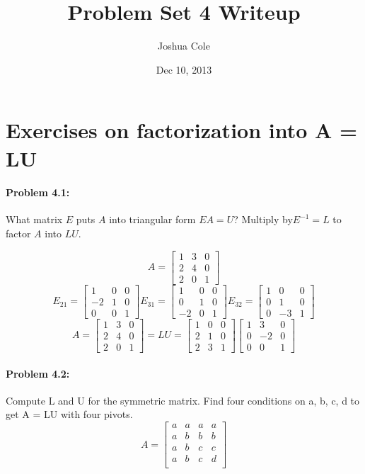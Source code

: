 \documentclass {article}
\begin{document}
\title {Problem Set 4 Writeup}
\author {Joshua Cole}
\date {Dec 10, 2013}
\maketitle
\section {Exercises on factorization into A = LU}
\paragraph{Problem 4.1:} What matrix $E$ puts $A$ into triangular form $EA = U$? Multi­ply by$ E^{−1} = L$ to factor $A$ into $LU$.

$$
A =
\begin{bmatrix}
1 & 3 & 0 \\
2 & 4 & 0 \\
2 & 0 & 1 
\end{bmatrix}
$$
$$
E_{21} =
\begin{bmatrix}
1 & 0 & 0 \\
-2 & 1 & 0 \\
0 & 0 & 1 
\end{bmatrix}
E_{31} = 
\begin{bmatrix}
1 & 0 & 0 \\
0 & 1 & 0 \\
-2 & 0 & 1 
\end{bmatrix}
E_{32} = 
\begin{bmatrix}
1 & 0 & 0 \\
0 & 1 & 0 \\
0 & -3 & 1 
\end{bmatrix}
$$
$$
A=\begin{bmatrix}
1 & 3 & 0 \\
2 & 4 & 0 \\
2 & 0 & 1 
\end{bmatrix}
=LU=
\begin{bmatrix}
1 & 0 & 0 \\
2 & 1 & 0 \\
2 & 3 & 1 
\end{bmatrix}
\begin{bmatrix}
1 & 3 & 0 \\
0 & -2 & 0 \\
0 & 0 & 1 
\end{bmatrix}
$$

\paragraph {Problem 4.2:} Compute L and U for the symmetric matrix. Find four conditions on a, b, c, d to get A = LU with four pivots.
$$
A=
\begin{bmatrix}
a & a & a & a \\
a & b & b & b  \\
a & b & c & c \\
a & b & c & d \\
\end{bmatrix}
$$
\end{document}
